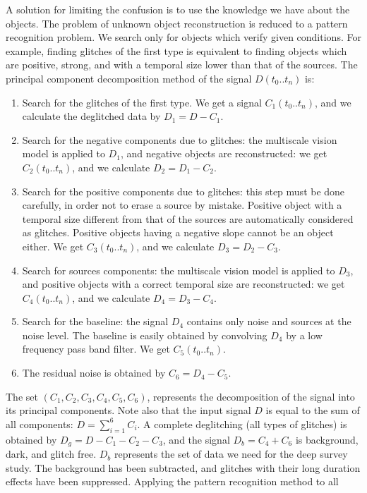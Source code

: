 A solution for limiting the confusion
is to use the knowledge we have about the objects. The problem
of unknown object reconstruction is reduced to a pattern recognition 
problem. We search only for objects which verify given 
conditions. For example, finding glitches of the first type is 
equivalent to  finding 
objects which are positive, strong, and with a temporal size lower 
than that of the sources. The principal component decomposition 
 method of the signal $D(t_0..t_n)$ is:
\begin{enumerate}
\item Search for the glitches of the first type. We get a signal $C_1(t_0..t_n)$, and
we calculate the deglitched data by $D_1 = D - C_1$.
\item Search for the negative components due to glitches: the multiscale 
vision
model is applied to $D_1$, and negative objects are reconstructed: we 
get $C_2(t_0..t_n)$, and we calculate $D_2 = D_1 - C_2$.
\item Search for the positive components due to glitches: this step must 
be
done carefully, in order not to erase a source by mistake.
Positive object with a temporal size different from that of the
sources are automatically considered as glitches. Positive objects having
a negative slope cannot be an object either.
 We get $C_3(t_0..t_n)$, and we calculate $D_3 = D_2 - C_3$.
\item Search for sources components: the multiscale vision
model is applied to $D_3$, and positive objects with a correct 
temporal
size are reconstructed: we get $C_4(t_0..t_n)$, and we calculate $D_4 
= D_3 - C_4$.
\item Search for the baseline: the signal $D_4$ contains only noise and 
sources at the noise level. The baseline is easily obtained by 
convolving
$D_4$ by a low frequency pass band filter. We get $C_5(t_0..t_n)$.
\item The residual noise is obtained by $C_6 = D_4 - C_5$.
\end{enumerate}
The set $(C_1,C_2,C_3,C_4,C_5,C_6)$, represents the decomposition of 
the
signal into its principal components. Note also that the input signal 
$D$ is
equal to the sum of all components: $D = \sum_{i=1}^{6} C_i$. 
A complete deglitching (all types of glitches) is obtained by 
$  D_g = D - C_1 - C_2 - C_3 $, 
and the signal  $D_b =  C_4 + C_6$ is background, dark, and glitch 
free.
$D_b$ represents the set of data we need for the deep survey study. 
The
background has been subtracted, and glitches with their long duration 
effects 
have been suppressed. Applying the pattern recognition method to all
